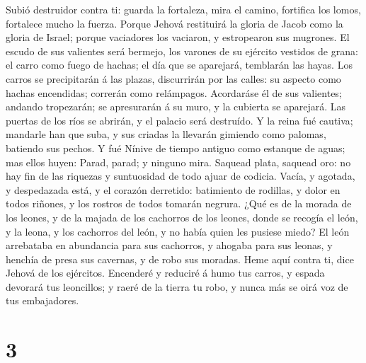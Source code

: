  Subió destruidor contra ti: guarda la fortaleza, mira el
camino, fortifica los lomos, fortalece mucho la fuerza. 
Porque Jehová restituirá la gloria de Jacob como la gloria de Israel;
porque vaciadores los vaciaron, y estropearon sus mugrones.
 El escudo de sus valientes será bermejo, los varones de
su ejército vestidos de grana: el carro como fuego de hachas; el día que
se aparejará, temblarán las hayas.  Los carros se
precipitarán á las plazas, discurrirán por las calles: su aspecto como
hachas encendidas; correrán como relámpagos.  Acordaráse
él de sus valientes; andando tropezarán; se apresurarán á su muro, y la
cubierta se aparejará.  Las puertas de los ríos se
abrirán, y el palacio será destruído.  Y la reina fué
cautiva; mandarle han que suba, y sus criadas la llevarán gimiendo como
palomas, batiendo sus pechos.  Y fué Nínive de tiempo
antiguo como estanque de aguas; mas ellos huyen: Parad, parad; y ninguno
mira.  Saquead plata, saquead oro: no hay fin de las
riquezas y suntuosidad de todo ajuar de codicia.  Vacía,
y agotada, y despedazada está, y el corazón derretido: batimiento de
rodillas, y dolor en todos riñones, y los rostros de todos tomarán
negrura.  ¿Qué es de la morada de los leones, y de la
majada de los cachorros de los leones, donde se recogía el león, y la
leona, y los cachorros del león, y no había quien les pusiese miedo?
 El león arrebataba en abundancia para sus cachorros, y
ahogaba para sus leonas, y henchía de presa sus cavernas, y de robo sus
moradas.  Heme aquí contra ti, dice Jehová de los
ejércitos. Encenderé y reduciré á humo tus carros, y espada devorará tus
leoncillos; y raeré de la tierra tu robo, y nunca más se oirá voz de tus
embajadores.

\hypertarget{section-2}{%
\section{3}\label{section-2}}


